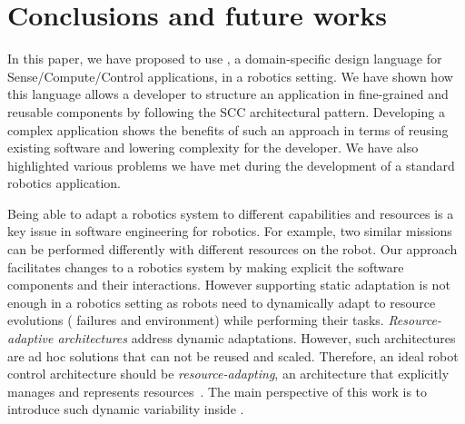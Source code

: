 
\section{Conclusions and future works}
\label{sec:conclusion}

In this paper, we have proposed to use \diaspec{}, a domain-specific
design language for Sense/Compute/Control applications, in a robotics
setting. We have shown how this language allows a developer to
structure an application in fine-grained and reusable components by
following the SCC architectural pattern. Developing a complex
application shows the benefits of such an approach in terms of reusing
existing software and lowering complexity for the developer. We have
also highlighted various problems we have met during the development
of a standard robotics application.

Being able to adapt a robotics system to different capabilities and
resources is a key issue in software engineering for robotics. For
example, two similar missions can be performed differently with
different resources on the robot. Our approach facilitates changes to
a robotics system by making explicit the software components and their
interactions. However supporting static adaptation is not enough in a
robotics setting as robots need to dynamically adapt to resource
evolutions (\eg{} failures and environment) while performing their
tasks. \emph{Resource-adaptive architectures} address dynamic
adaptations. However, such architectures are ad hoc solutions that can
not be reused and scaled. Therefore, an ideal robot control
architecture should be \emph{resource-adapting}, \ie{} an architecture
that explicitly manages and represents resources~\cite{Bour07a}. The
main perspective of this work is to introduce such dynamic variability
inside \diaspec{}.
